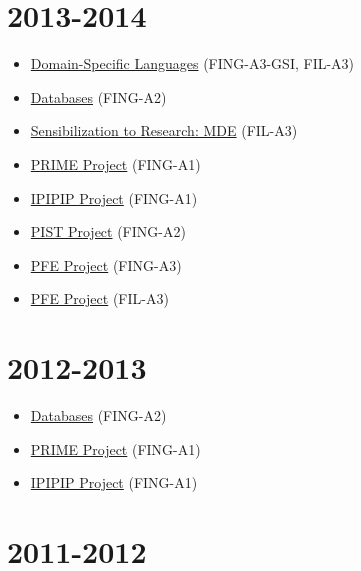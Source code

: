 \hypertarget{section-7}{%
\section{2013-2014}\label{section-7}}

\begin{itemize}
\tightlist
\item
  \href{https://campusneo.mines-nantes.fr/campus/course/view.php?id=1415}{Domain-Specific
  Languages} (FING-A3-GSI, FIL-A3)
\item
  \href{https://campusneo.mines-nantes.fr/campus/course/view.php?id=1327}{Databases}
  (FING-A2)
\item
  \href{https://campusneo.mines-nantes.fr/campus/course/view.php?id=1532}{Sensibilization
  to Research: MDE} (FIL-A3)
\item
  \href{https://campusneo.mines-nantes.fr/campus/course/view.php?id=621}{PRIME
  Project} (FING-A1)
\item
  \href{https://campusneo.mines-nantes.fr/campus/course/view.php?id=391}{IPIPIP
  Project} (FING-A1)
\item
  \href{https://campusneo.mines-nantes.fr/campus/course/view.php?id=115}{PIST
  Project} (FING-A2)
\item
  \href{https://campusneo.mines-nantes.fr/campus/course/view.php?id=1305}{PFE
  Project} (FING-A3)
\item
  \href{https://campusneo.mines-nantes.fr/campus/course/view.php?id=1344}{PFE
  Project} (FIL-A3)
\end{itemize}

\hypertarget{section-8}{%
\section{2012-2013}\label{section-8}}

\begin{itemize}
\tightlist
\item
  \href{https://campusneo.mines-nantes.fr/campus/course/view.php?id=1133}{Databases}
  (FING-A2)
\item
  \href{https://campusneo.mines-nantes.fr/campus/course/view.php?id=621}{PRIME
  Project} (FING-A1)
\item
  \href{https://campusneo.mines-nantes.fr/campus/course/view.php?id=391}{IPIPIP
  Project} (FING-A1)
\end{itemize}

\hypertarget{section-9}{%
\section{2011-2012}\label{section-9}}

